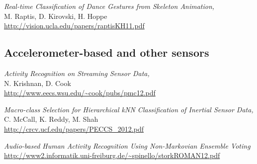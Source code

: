 \documentclass[letterpaper,12pt,fullpage]{article}
\begin{document}
{\it Real-time Classification of Dance Gestures from Skeleton Animation,}\\
M. Raptis, D. Kirovski, H. Hoppe\\
\url{http://vision.ucla.edu/papers/raptisKH11.pdf}

\subsection{Accelerometer-based and other sensors}

{\it Activity Recognition on Streaming Sensor Data,}\\
N. Krishnan, D. Cook\\
\url{http://www.eecs.wsu.edu/~cook/pubs/pmc12.pdf}

{\it Macro-class Selection for Hierarchical kNN Classification of Inertial
Sensor Data,}\\
C. McCall, K. Reddy, M. Shah\\
\url{http://crcv.ucf.edu/papers/PECCS_2012.pdf}

{\it Audio-based Human Activity Recognition Using Non-Markovian Ensemble
Voting}\\
\url{http://www2.informatik.uni-freiburg.de/~spinello/storkROMAN12.pdf}



\end{document}
